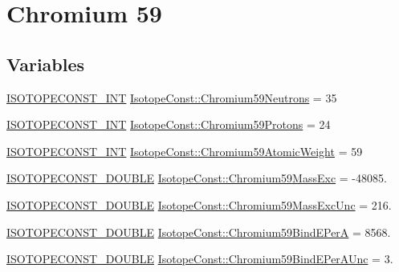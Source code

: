 \hypertarget{group___isotope_const-_chromium-_cr59}{}\section{Chromium 59}
\label{group___isotope_const-_chromium-_cr59}
\subsection*{Variables}
\begin{DoxyCompactItemize}
\item 
\mbox{\hyperlink{group___isotope_const-_macros_ga5f18360b3e99483a35c32d789e62621c}{I\+S\+O\+T\+O\+P\+E\+C\+O\+N\+S\+T\+\_\+\+I\+NT}} \mbox{\hyperlink{group___isotope_const-_chromium-_cr59_gacd811f4d50abaa65c3ed46d4f5d05fd3}{Isotope\+Const\+::\+Chromium59\+Neutrons}} = 35
\item 
\mbox{\hyperlink{group___isotope_const-_macros_ga5f18360b3e99483a35c32d789e62621c}{I\+S\+O\+T\+O\+P\+E\+C\+O\+N\+S\+T\+\_\+\+I\+NT}} \mbox{\hyperlink{group___isotope_const-_chromium-_cr59_ga0f394ade0e65e1de67b260e9d0b38121}{Isotope\+Const\+::\+Chromium59\+Protons}} = 24
\item 
\mbox{\hyperlink{group___isotope_const-_macros_ga5f18360b3e99483a35c32d789e62621c}{I\+S\+O\+T\+O\+P\+E\+C\+O\+N\+S\+T\+\_\+\+I\+NT}} \mbox{\hyperlink{group___isotope_const-_chromium-_cr59_ga4964524515334a7bbb081ba1a58cdf76}{Isotope\+Const\+::\+Chromium59\+Atomic\+Weight}} = 59
\item 
\mbox{\hyperlink{group___isotope_const-_macros_ga8f45a7272ce02c0b4c65c44636ed719a}{I\+S\+O\+T\+O\+P\+E\+C\+O\+N\+S\+T\+\_\+\+D\+O\+U\+B\+LE}} \mbox{\hyperlink{group___isotope_const-_chromium-_cr59_gac7b4b99c554ee4ca78f9aee14f4b976a}{Isotope\+Const\+::\+Chromium59\+Mass\+Exc}} = -\/48085.
\item 
\mbox{\hyperlink{group___isotope_const-_macros_ga8f45a7272ce02c0b4c65c44636ed719a}{I\+S\+O\+T\+O\+P\+E\+C\+O\+N\+S\+T\+\_\+\+D\+O\+U\+B\+LE}} \mbox{\hyperlink{group___isotope_const-_chromium-_cr59_gab442897750c85e107fb6342967b6665a}{Isotope\+Const\+::\+Chromium59\+Mass\+Exc\+Unc}} = 216.
\item 
\mbox{\hyperlink{group___isotope_const-_macros_ga8f45a7272ce02c0b4c65c44636ed719a}{I\+S\+O\+T\+O\+P\+E\+C\+O\+N\+S\+T\+\_\+\+D\+O\+U\+B\+LE}} \mbox{\hyperlink{group___isotope_const-_chromium-_cr59_ga50bcbaa0bdf8c776037b2f597e340fcb}{Isotope\+Const\+::\+Chromium59\+Bind\+E\+PerA}} = 8568.
\item 
\mbox{\hyperlink{group___isotope_const-_macros_ga8f45a7272ce02c0b4c65c44636ed719a}{I\+S\+O\+T\+O\+P\+E\+C\+O\+N\+S\+T\+\_\+\+D\+O\+U\+B\+LE}} \mbox{\hyperlink{group___isotope_const-_chromium-_cr59_ga0aa5cd03c0f745c4bc1a1e158388046b}{Isotope\+Const\+::\+Chromium59\+Bind\+E\+Per\+A\+Unc}} = 3.

\end{DoxyCompactItemize}
